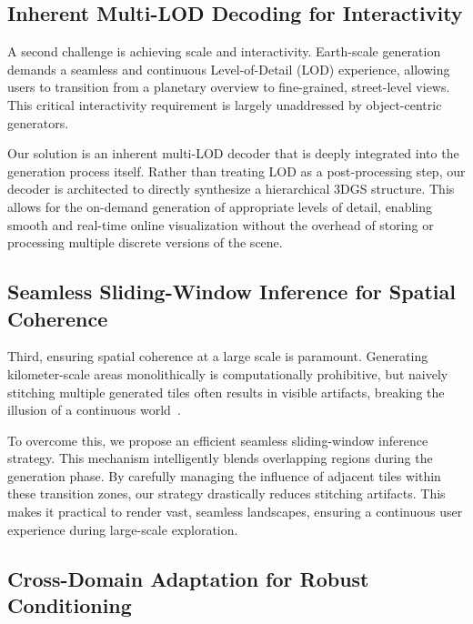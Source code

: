 \documentclass{llmxive}
\begin{document}
\subsection{Inherent Multi-LOD Decoding for Interactivity}
\label{sec:lod_decoder}

A second challenge is achieving {scale and interactivity}. Earth-scale generation demands a seamless and continuous Level-of-Detail (LOD) experience, allowing users to transition from a planetary overview to fine-grained, street-level views. This critical interactivity requirement is largely unaddressed by object-centric generators.

Our solution is an inherent multi-LOD decoder that is deeply integrated into the generation process itself. Rather than treating LOD as a post-processing step, our decoder is architected to directly synthesize a hierarchical 3DGS structure. This allows for the on-demand generation of appropriate levels of detail, enabling smooth and real-time online visualization without the overhead of storing or processing multiple discrete versions of the scene.

\subsection{Seamless Sliding-Window Inference for Spatial Coherence}
\label{sec:sliding_window}

Third, ensuring {spatial coherence} at a large scale is paramount. Generating kilometer-scale areas monolithically is computationally prohibitive, but naively stitching multiple generated tiles often results in visible artifacts, breaking the illusion of a continuous world~\cite{blockfusion,ren2024xcube,earthcrafter,Qian_2023_Sat2Density,sat2densitypp,qian2026sat3dgen}.

To overcome this, we propose an efficient seamless sliding-window inference strategy. This mechanism intelligently blends overlapping regions during the generation phase. By carefully managing the influence of adjacent tiles within these transition zones, our strategy drastically reduces stitching artifacts. This makes it practical to render vast, seamless landscapes, ensuring a continuous user experience during large-scale exploration.

\subsection{Cross-Domain Adaptation for Robust Conditioning}
\label{sec:conditioning}
\end{document}
